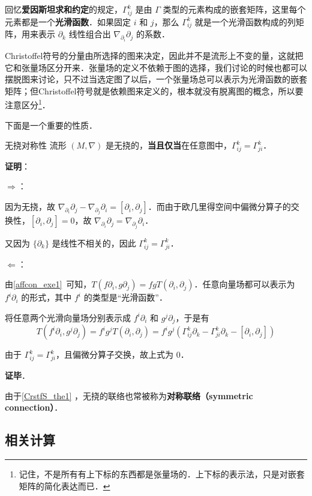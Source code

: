 回忆\textbf{爱因斯坦求和约定}的规定，$\Gamma^k_{ij}$ 是由 $\Gamma$ 类型的元素构成的嵌套矩阵，这里每个元素都是一个\textbf{光滑函数}．如果固定 $i$ 和 $j$，那么 $\Gamma^k_{ij}$ 就是一个光滑函数构成的列矩阵，用来表示 $\partial_k$ 线性组合出 $\nabla_{\partial_i}\partial_j$ 的系数．

Christoffel符号的分量由所选择的图来决定，因此并不是流形上不变的量，这就把它和张量场区分开来．张量场的定义不依赖于图的选择，我们讨论的时候也都可以摆脱图来讨论，只不过当选定图了以后，一个张量场总可以表示为光滑函数的嵌套矩阵；但Christoffel符号就是依赖图来定义的，根本就没有脱离图的概念，所以要注意区分\footnote{记住，不是所有有上下标的东西都是张量场的．上下标的表示法，只是对嵌套矩阵的简化表达而已．}．


下面是一个重要的性质．

\begin{theorem}{无挠对称性}\label{CrstfS_the1}
流形 $(M, \nabla)$ 是无挠的，\textbf{当且仅当}在任意图中，$\Gamma^k_{ij}=\Gamma^k_{ji}$．
\end{theorem}

\textbf{证明}：

$\Rightarrow$：

因为无挠，故 $\nabla_{\partial_i}\partial_j-\nabla_{\partial_j}\partial_i=[\partial_i, \partial_j]$．而由于欧几里得空间中偏微分算子的交换性，$[\partial_i, \partial_j]=0$，故 $\nabla_{\partial_i}\partial_j=\nabla_{\partial_j}\partial_i$．

又因为 $\{\partial_k\}$ 是线性不相关的，因此 $\Gamma^k_{ij}=\Gamma^k_{ji}$．

$\Leftarrow$：

由\autoref{affcon_exe1}~可知，$T(f\partial_i, g\partial_j)=fgT(\partial_i, \partial_j)$．任意向量场都可以表示为 $f^i\partial_i$ 的形式，其中 $f^i$ 的类型是“光滑函数”．

将任意两个光滑向量场分别表示成 $f^i\partial_i$ 和 $g^j\partial_j$，于是有
\begin{equation}
T(f^i\partial_i, g^j\partial_j)=f^ig^jT(\partial_i, \partial_j)=f^ig^j(\Gamma^k_{ij}\partial_k-\Gamma^k_{ji}\partial_k-[\partial_i, \partial_j])
\end{equation}

由于 $\Gamma^k_{ij}=\Gamma^k_{ji}$，且偏微分算子交换，故上式为 $0$．

\textbf{证毕}．

由于\autoref{CrstfS_the1} ，无挠的联络也常被称为\textbf{对称联络（symmetric connection）}．


\subsection{相关计算}

